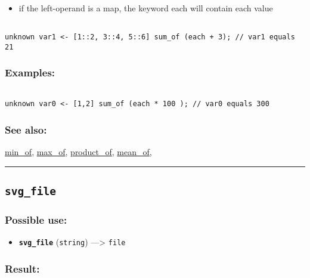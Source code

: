 \documentclass[]{book}
\providecommand{\tightlist}{%
  \setlength{\itemsep}{0pt}\setlength{\parskip}{0pt}}
\theoremstyle{definition}
\theoremstyle{definition}
\theoremstyle{definition}
\theoremstyle{remark}
\begin{document}
\begin{itemize}
\tightlist
\item
  if the left-operand is a map, the keyword each will contain each value
\end{itemize}

\begin{verbatim}
 
unknown var1 <- [1::2, 3::4, 5::6] sum_of (each + 3); // var1 equals 21
\end{verbatim}

\subsubsection{Examples:}\label{examples-353}

\begin{verbatim}
 
unknown var0 <- [1,2] sum_of (each * 100 ); // var0 equals 300
\end{verbatim}

\subsubsection{See also:}\label{see-also-200}

\href{OperatorsIM\#min_of}{min\_of},
\href{OperatorsIM\#max_of}{max\_of},
\href{OperatorsNR\#product_of}{product\_of},
\href{OperatorsIM\#mean_of}{mean\_of},

\begin{center}\rule{0.5\linewidth}{\linethickness}\end{center}

\subsection{\texorpdfstring{\texttt{svg\_file}}{svg\_file}}\label{svg_file}

\subsubsection{Possible use:}\label{possible-use-511}

\begin{itemize}
\tightlist
\item
  \textbf{\texttt{svg\_file}} (\texttt{string}) ---\textgreater{}
  \texttt{file}
\end{itemize}

\subsubsection{Result:}\label{result-494}
\end{document}
